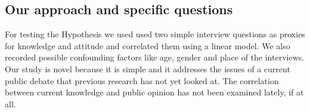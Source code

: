 \subsection{Our approach and specific questions}

For testing the Hypothesis we used used two simple interview questions as proxies for knowledge and attitude and correlated them using a linear model. We also recorded possible confounding factors like age, gender and place of the interviews.
Our study is novel because it is simple and it addresses the issues of a current public debate that previous research has not yet looked at. The correlation between current knowledge and public opinion has not been examined lately, if at all.
